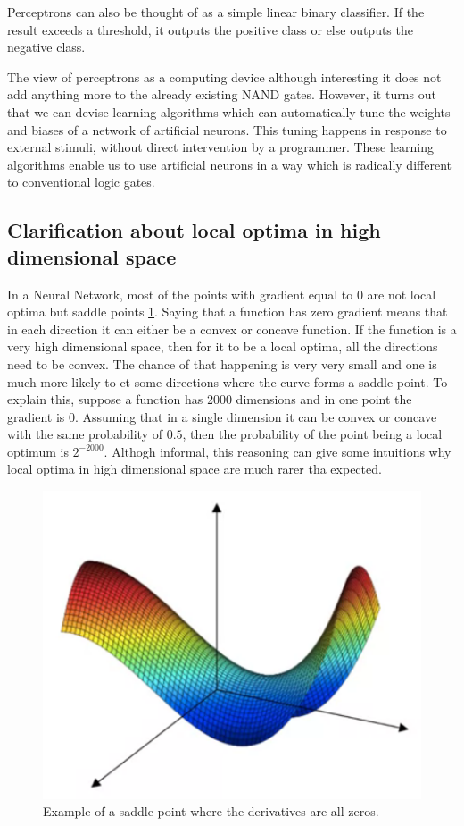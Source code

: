 Perceptrons can also be thought of as a simple linear binary classifier. If the result exceeds a threshold, it outputs the positive class or else outputs the negative class. 

The view of perceptrons as a computing device although interesting it does not add anything more to the already existing NAND gates. However, it turns out that we can devise learning algorithms which can automatically tune the weights and biases of a network of artificial neurons. This tuning happens in response to external stimuli, without direct intervention by a programmer. These learning algorithms enable us to use artificial neurons in a way which is radically different to conventional logic gates.

\subsection{Clarification about local optima in high dimensional space}
In a Neural Network, most of the points with gradient equal to $0$ are not local optima but saddle points \ref{img:saddle}. Saying that a function has zero gradient means that in each direction it can either be a convex or concave function. If the function is a very high dimensional space, then for it to be a local optima, all the directions need to be convex. The chance of that happening is very very small and one is much more likely to et some directions where the curve forms a saddle point. To explain this, suppose a function has 2000 dimensions and in one point the gradient is $0$. Assuming that in a single dimension it can be convex or concave with the same probability of $0.5$, then the probability of the point being a local optimum is $2^{-2000}$. Althogh informal, this reasoning can give some intuitions why local optima in high dimensional space are much rarer tha expected.

\begin{figure}
\centering
\includegraphics[scale=0.6]{img/saddle}
\caption{Example of a saddle point where the derivatives are all zeros.}
\label{img:saddle}
\end{figure}


